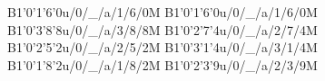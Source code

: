B1'0'1'6'0u/0/_/a/1/6/0M
B1'0'1'6'0u/0/_/a/1/6/0M
B1'0'3'8'8u/0/_/a/3/8/8M
B1'0'2'7'4u/0/_/a/2/7/4M
B1'0'2'5'2u/0/_/a/2/5/2M
B1'0'3'1'4u/0/_/a/3/1/4M
B1'0'1'8'2u/0/_/a/1/8/2M
B1'0'2'3'9u/0/_/a/2/3/9M
